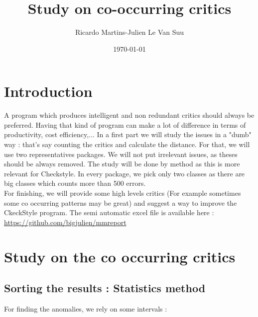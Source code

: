 \documentclass{article}
\begin{document}
\title{Study on co-occurring critics}
\author{Ricardo Martins-Julien Le Van Suu}
\date\today
\maketitle
\section{Introduction}
A program which produces intelligent and non redundant critics should always be preferred. Having that kind of program can make a lot of difference in terms of productivity, cost efficiency,... 
In a first part we will study the issues in a "dumb" way : that's say counting the critics and calculate the distance.
For that, we will use two representatives packages. We will not put irrelevant issues, as theses should be always removed. The study will be done by method as this is more relevant for Checkstyle. In every package, we pick only two classes as there are big classes which counts more than 500 errors. \\
For finishing, we will provide some high levels critics (For example sometimes some co occurring patterns may be great) and suggest a way to improve the CkeckStyle program. The semi automatic excel file is available here : \url{https://github.com/bigjulien/mmreport}

\section{Study on the co occurring critics}

\subsection{Sorting the results : Statistics method} 
For finding the anomalies, we rely on some intervals : 
\end{document}
